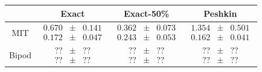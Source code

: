 \documentclass[conference]{IEEEtran}
\begin{document}
\begin{table}
  \begin{center}
      \begin{tabular}[c]{cccc}
        \toprule
        & Exact & Exact-50\% & Peshkin \\
        \midrule
        MIT & $\begin{matrix}0.670\\0.172\end{matrix} \begin{matrix}\pm\\\pm\end{matrix} \begin{matrix}0.141\\ 0.047\end{matrix}$ & $\begin{matrix}\mathbf{0.362}\\\mathbf{0.243}\end{matrix} \begin{matrix}\pm\\\pm\end{matrix} \begin{matrix}0.073\\ 0.053\end{matrix}$ & $\begin{matrix}1.354\\0.162\end{matrix} \begin{matrix}\pm\\\pm\end{matrix} \begin{matrix}0.501\\ 0.041\end{matrix}$ \\
        \midrule
        Bipod & $\begin{matrix}??\\??\end{matrix} \begin{matrix}\pm\\\pm\end{matrix} \begin{matrix}??\\ ??\end{matrix}$ & $\begin{matrix}??\\??\end{matrix} \begin{matrix}\pm\\\pm\end{matrix} \begin{matrix}??\\ ??\end{matrix}$ & $\begin{matrix}??\\??\end{matrix} \begin{matrix}\pm\\\pm\end{matrix} \begin{matrix}??\\??\end{matrix}$ \\

\end{tabular}
\end{center}
\end{table}
\end{document}
